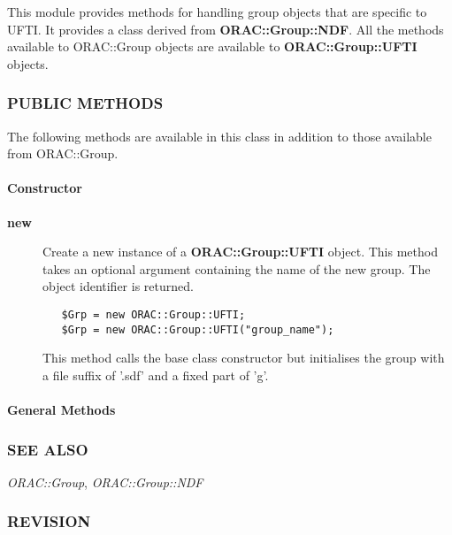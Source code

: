 This module provides methods for handling group objects that
are specific to UFTI. It provides a class derived from \textbf{ORAC::Group::NDF}.
All the methods available to ORAC::Group objects are available
to \textbf{ORAC::Group::UFTI} objects.

\subsubsection*{PUBLIC METHODS\label{ORAC::Group::UFTI_PUBLIC_METHODS}}


The following methods are available in this class in addition to
those available from ORAC::Group.

\paragraph*{Constructor\label{ORAC::Group::UFTI_Constructor}}
\begin{description}

\item[{\textbf{new}}] \mbox{}

Create a new instance of a \textbf{ORAC::Group::UFTI} object.
This method takes an optional argument containing the
name of the new group. The object identifier is returned.

\begin{verbatim}
   $Grp = new ORAC::Group::UFTI;
   $Grp = new ORAC::Group::UFTI("group_name");
\end{verbatim}


This method calls the base class constructor but initialises
the group with a file suffix of '.sdf' and a fixed part
of 'g'.

\end{description}
\paragraph*{General Methods\label{ORAC::Group::UFTI_General_Methods}}
\subsubsection*{SEE ALSO\label{ORAC::Group::UFTI_SEE_ALSO}}


\emph{ORAC::Group}, \emph{ORAC::Group::NDF}

\subsubsection*{REVISION\label{ORAC::Group::UFTI_REVISION}}


